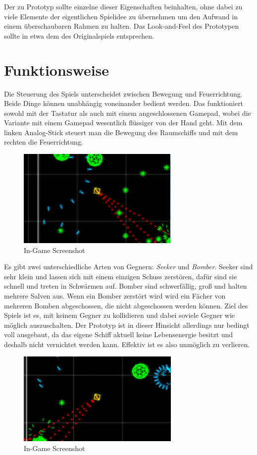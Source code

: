 \documentclass[a4paper]{article}
\begin{document}
Der zu Prototyp sollte einzelne dieser Eigenschaften beinhalten, ohne dabei zu viele Elemente der eigentlichen Spielidee zu übernehmen um den Aufwand in einem überschaubaren Rahmen zu halten. Das Look-and-Feel des Prototypen sollte in etwa dem des Originalspiels entsprechen.

\newpage
\section{Funktionsweise}
Die Steuerung des Spiels unterscheidet zwischen Bewegung und Feuerrichtung. Beide Dinge können unabhängig voneinander bedient werden. Das funktioniert sowohl mit der Tastatur als auch mit einem angeschlossenen Gamepad, wobei die Variante mit einem Gamepad wesentlich flüssiger von der Hand geht. Mit dem linken Analog-Stick steuert man die Bewegung des Raumschiffs und mit dem rechten die Feuerrichtung. 

\begin{figure}[H]
\centering
\includegraphics[width=0.7\textwidth]{screenshot1_crop.png}
\caption{In-Game Screenshot}
\end{figure}

Es gibt zwei unterschiedliche Arten von Gegnern: \textit{Seeker} und \textit{Bomber}. Seeker sind sehr klein und lassen sich mit einem einzigen Schuss zerstören, dafür sind sie schnell und treten in Schwärmen auf. Bomber sind schwerfällig, groß und halten mehrere Salven aus. Wenn ein Bomber zerstört wird wird ein Fächer von mehreren Bomben abgeschossen, die nicht abgeschossen werden können. Ziel des Spiels ist es, mit keinem Gegner zu kollidieren und dabei soviele Gegner wie möglich auszuschalten. Der Prototyp ist in dieser Hinsicht allerdings nur bedingt voll ausgebaut, da das eigene Schiff aktuell keine Lebensenergie besitzt und deshalb nicht vernichtet werden kann. Effektiv ist es also unmöglich zu verlieren.

\begin{figure}[H]
\centering
\includegraphics[width=0.7\textwidth]{screenshot2_crop.png}
\caption{In-Game Screenshot}
\end{figure}
\end{document}
